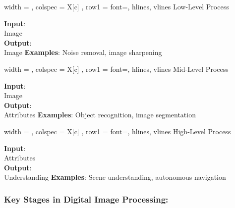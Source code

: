 \noindent
\begin{minipage}[t]{0.3\linewidth}
  \begin{tblr}{
      width   = \linewidth,
      colspec = { X[c] },
      row{1}  = { font=\bfseries },
      hlines, vlines
    }
    Low-Level Process \\
    \parbox[c][12em][b]{\linewidth}{%
      \textbf{Input}:\\ Image\\
      \textbf{Output}:\\ Image
      \vfill
      \textbf{Examples}: Noise removal, image sharpening
    }
  \end{tblr}
\end{minipage}\hfill
\begin{minipage}[t]{0.3\linewidth}
  \begin{tblr}{
      width   = \linewidth,
      colspec = { X[c] },
      row{1}  = { font=\bfseries },
      hlines, vlines
    }
    Mid-Level Process \\
    \parbox[c][12em][b]{\linewidth}{%
      \textbf{Input}:\\ Image\\
      \textbf{Output}:\\ Attributes
      \vfill
      \textbf{Examples}: Object recognition, image segmentation
    }
  \end{tblr}
\end{minipage}\hfill
\begin{minipage}[t]{0.3\linewidth}
  \begin{tblr}{
      width   = \linewidth,
      colspec = { X[c] },
      row{1}  = { font=\bfseries },
      hlines, vlines
    }
    High-Level Process \\
    \parbox[c][12em][b]{\linewidth}{%
      \textbf{Input}:\\ Attributes\\
      \textbf{Output}:\\ Understanding
      \vfill
      \textbf{Examples}: Scene understanding, autonomous navigation
    }
  \end{tblr}
\end{minipage}

\subsubsection*{Key Stages in Digital Image Processing:}

